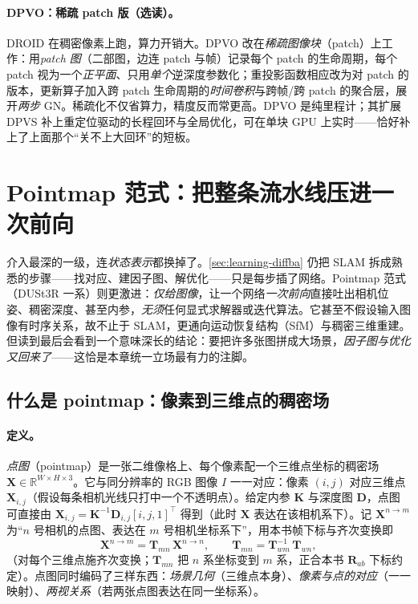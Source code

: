 \paragraph{DPVO：稀疏 patch 版（选读）。}
DROID 在稠密像素上跑，算力开销大。DPVO\cite{teed2023dpvo} 改在\emph{稀疏图像块}（patch）上工作：用\emph{patch 图}（二部图，边连 patch 与帧）记录每个 patch 的生命周期，每个 patch 视为一个\emph{正平面}、只用\emph{单个}逆深度参数化；重投影函数相应改为对 patch 的版本，更新算子加入跨 patch 生命周期的\emph{时间卷积}与跨帧/跨 patch 的聚合层，展开\emph{两步} GN。稀疏化不仅省算力，精度反而常更高。DPVO 是纯里程计；其扩展 DPVS\cite{lipson2024dpvs} 补上重定位驱动的长程回环与全局优化，可在单块 GPU 上实时——恰好补上了上面那个“关不上大回环”的短板。

\section{Pointmap 范式：把整条流水线压进一次前向}
\label{sec:learning-pointmap}

介入最深的一级，连\emph{状态表示}都换掉了。\cref{sec:learning-diffba} 仍把 SLAM 拆成熟悉的步骤——找对应、建因子图、解优化——只是每步插了网络。Pointmap 范式（DUSt3R\cite{wang2024dust3r} 一系）则更激进：\emph{仅给图像}，让一个网络\emph{一次前向}直接吐出相机位姿、稠密深度、甚至内参，\emph{无须}任何显式求解器或迭代算法。它甚至不假设输入图像有时序关系，故不止于 SLAM，更通向运动恢复结构（SfM）与稠密三维重建。但读到最后会看到一个意味深长的结论：要把许多张图拼成大场景，\emph{因子图与优化又回来了}——这恰是本章统一立场最有力的注脚。

\subsection{什么是 pointmap：像素到三维点的稠密场}
\label{sec:learning-pointmap-def}

\paragraph{定义。}
\emph{点图}（pointmap）是一张二维像格上、每个像素配一个三维点坐标的稠密场 $\mathbf{X}\in\mathbb{R}^{W\times H\times 3}$\cite{wang2024dust3r}。它与同分辨率的 RGB 图像 $I$ 一一对应：像素 $(i,j)$ 对应三维点 $\mathbf{X}_{i,j}$（假设每条相机光线只打中一个不透明点）。给定内参 $\mathbf{K}$ 与深度图 $\mathbf{D}$，点图可直接由 $\mathbf{X}_{i,j}=\mathbf{K}^{-1}\mathbf{D}_{i,j}[i,j,1]^\top$ 得到（此时 $\mathbf{X}$ 表达在该相机系下）。记 $\mathbf{X}^{n\to m}$ 为“$n$ 号相机的点图、表达在 $m$ 号相机坐标系下”，用本书帧下标与齐次变换即
\begin{equation}
  \mathbf{X}^{n\to m}=\mathbf{T}_{mn}\,\mathbf{X}^{n\to n},
  \qquad \mathbf{T}_{mn}=\mathbf{T}_{wm}^{-1}\,\mathbf{T}_{wn},
  \label{eq:learn-pointmap-frame}
\end{equation}
（对每个三维点施齐次变换；$\mathbf{T}_{mn}$ 把 $n$ 系坐标变到 $m$ 系，正合本书 $\mathbf{R}_{ab}$ 下标约定）。点图同时编码了三样东西：\emph{场景几何}（三维点本身）、\emph{像素与点的对应}（一一映射）、\emph{两视关系}（若两张点图表达在同一坐标系）。

